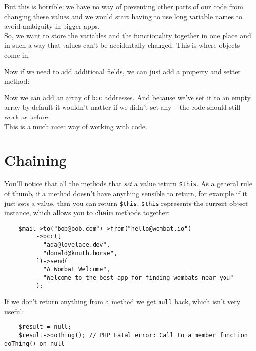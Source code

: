 
But this is horrible: we have no way of preventing other parts of our code from changing these values and we would start having to use long variable names to avoid ambiguity in bigger apps.
\\

So, we want to store the variables and the functionality together in one place and in such a way that values can't be accidentally changed. This is where objects come in:


Now if we need to add additional fields, we can just add a property and setter method:


Now we can add an array of \texttt{bcc} addresses. And because we've set it to an empty array by default it wouldn't matter if we didn't set any – the code should still work as before.
\\

This is a much nicer way of working with code.


\section{Chaining}

You'll notice that all the methods that \textit{set} a value return \texttt{\$this}. As a general rule of thumb, if a method doesn't have anything sensible to return, for example if it just sets a value, then you can return \texttt{\$this}. \texttt{\$this} represents the current object instance, which allows you to \textbf{chain} methods together:

\begin{verbatim}
    $mail->to("bob@bob.com")->from("hello@wombat.io")
         ->bcc([
           "ada@lovelace.dev",
           "donald@knuth.horse",
         ])->send(
           "A Wombat Welcome",
           "Welcome to the best app for finding wombats near you"
         );
\end{verbatim}

If we don't return anything from a method we get \texttt{null} back, which isn't very useful:

\begin{verbatim}
    $result = null;
    $result->doThing(); // PHP Fatal error: Call to a member function doThing() on null
\end{verbatim}

